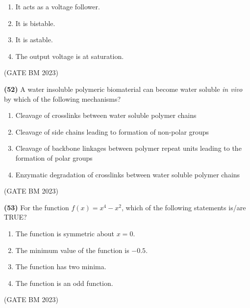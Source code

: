 \documentclass[journal]{IEEEtran}
\numberwithin{equation}{enumi}
\numberwithin{figure}{enumi}
\begin{document}
\begin{figure}[H]
\centering
{}%

\label{fig:my_label}
\end{figure}

\begin{enumerate}[label=(\Alph*)]
    \item It acts as a voltage follower.
    \item It is bistable.
    \item It is astable.
    \item The output voltage is at saturation.
\end{enumerate}
\hfill (GATE BM 2023)

\textbf{(52)}
A water insoluble polymeric biomaterial can become water soluble \textit{in vivo} by which of the following mechanisms?

\begin{enumerate}[label=(\Alph*)]
    \item Cleavage of crosslinks between water soluble polymer chains
    \item Cleavage of side chains leading to formation of non-polar groups
    \item Cleavage of backbone linkages between polymer repeat units leading to the formation of polar groups
    \item Enzymatic degradation of crosslinks between water soluble polymer chains
\end{enumerate}
\hfill (GATE BM 2023)

\textbf{(53)}
For the function \( f(x) = x^4 - x^2 \), which of the following statements is/are TRUE?

\begin{enumerate}[label=(\Alph*)]
    \item The function is symmetric about \( x = 0 \).
    \item The minimum value of the function is \( -0.5 \).
    \item The function has two minima.
    \item The function is an odd function.
\end{enumerate}
\hfill (GATE BM 2023)
\end{document}
